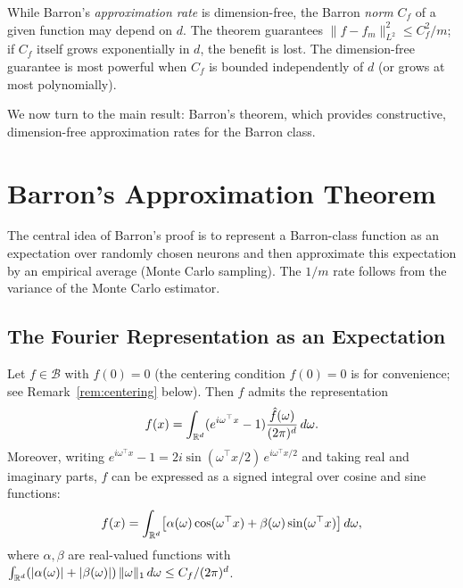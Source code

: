 \documentclass[11pt,a4paper]{article}
\begin{document}
\begin{warning}[title={The Barron Class Depends on Dimension}]
While Barron's \emph{approximation rate} is dimension-free, the Barron
\emph{norm} $C_f$ of a given function may depend on $d$.  The theorem
guarantees $\|f - f_m\|_{L^2}^2 \le C_f^2/m$; if $C_f$ itself grows
exponentially in $d$, the benefit is lost.  The dimension-free guarantee
is most powerful when $C_f$ is bounded independently of $d$ (or grows at
most polynomially).
\end{warning}

We now turn to the main result: Barron's theorem, which provides
constructive, dimension-free approximation rates for the Barron class.

\section{Barron's Approximation Theorem}
\label{sec:barron-theorem}

The central idea of Barron's proof is to represent a Barron-class function
as an expectation over randomly chosen neurons and then approximate
this expectation by an empirical average (Monte Carlo sampling).  The
$1/m$ rate follows from the variance of the Monte Carlo estimator.

\subsection{The Fourier Representation as an Expectation}
\label{sec:fourier-expectation}

\begin{lemma}
\label{lem:fourier-rep}
Let $f \in \mathcal{B}$ with $f(0) = 0$ (the centering condition
$f(0) = 0$ is for convenience; see Remark~\ref{rem:centering} below).
Then $f$ admits the representation
\begin{equation}
\label{eq:fourier-rep}
  f(x) = \int_{\mathbb{R}^d} (e^{i\omega^\top x} - 1)
  \frac{\hat{f}(\omega)}{(2\pi)^d} \, d\omega.
\end{equation}
Moreover, writing $e^{i\omega^\top x} - 1 = 2i \sin(\omega^\top x / 2)
\, e^{i\omega^\top x / 2}$ and taking real and imaginary parts, $f$ can
be expressed as a signed integral over cosine and sine functions:
\begin{equation}
\label{eq:trig-rep}
  f(x) = \int_{\mathbb{R}^d} \bigl[ \alpha(\omega) \cos(\omega^\top x)
  + \beta(\omega) \sin(\omega^\top x) \bigr] \, d\omega,
\end{equation}
where $\alpha, \beta$ are real-valued functions with
$\int_{\mathbb{R}^d} (|\alpha(\omega)| + |\beta(\omega)|) \, \|\omega\|_1 \,
d\omega \le C_f / (2\pi)^d$.
\end{lemma}
\end{document}
